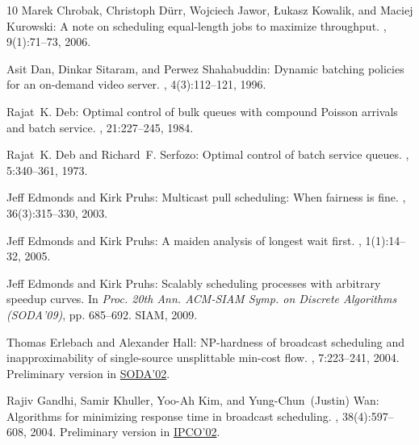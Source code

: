 \begin{thebibliography}{10}
{\sc Marek Chrobak, Christoph D\"{u}rr, Wojciech Jawor, {\L}ukasz Kowalik, and
  Maciej Kurowski}: A note on scheduling equal-length jobs to maximize
  throughput.
, 9(1):71--73, 2006.
\newblock [\epfmtdoi{10.1007/s10951-006-5595-4}]

{\sc Asit Dan, Dinkar Sitaram, and Perwez Shahabuddin}: Dynamic batching
  policies for an on-demand video server.
, 4(3):112--121, 1996.
\newblock [\epfmtdoi{10.1007/s005300050016}]

{\sc Rajat~K. Deb}: Optimal control of bulk queues with compound {P}oisson
  arrivals and batch service.
, 21:227--245, 1984.

{\sc Rajat~K. Deb and Richard~F. Serfozo}: Optimal control of batch service
  queues.
, 5:340--361, 1973.
\newblock [\epfmtdoi{10.2307/1426040}]

{\sc Jeff Edmonds and Kirk Pruhs}: Multicast pull scheduling: When fairness is
  fine.
, 36(3):315--330, 2003.
\newblock [\epfmtdoi{10.1007/s00453-003-1018-5}]

{\sc Jeff Edmonds and Kirk Pruhs}: A maiden analysis of longest wait first.
, 1(1):14--32, 2005.
\newblock [\epfmtdoi{10.1145/1077464.1077467}]

{\sc Jeff Edmonds and Kirk Pruhs}: Scalably scheduling processes with arbitrary
  speedup curves.
\newblock In {\em Proc. 20th Ann. ACM-SIAM Symp. on Discrete Algorithms
  (SODA'09)}, pp. 685--692. SIAM, 2009.
\newblock [\epfmtdoi{10.1145/1496770.1496845}]

{\sc Thomas Erlebach and Alexander Hall}: {NP}-hardness of broadcast scheduling
  and inapproximability of single-source unsplittable min-cost flow.
, 7:223--241, 2004.
\newblock Preliminary version in
  \href{https://dl.acm.org/citation.cfm?id=545381.545405}{SODA'02}.

{\sc Rajiv Gandhi, Samir Khuller, Yoo-Ah Kim, and Yung-Chun~(Justin) Wan}:
  Algorithms for minimizing response time in broadcast scheduling.
, 38(4):597--608, 2004.
\newblock Preliminary version in
  \href{https://dl.acm.org/citation.cfm?id=660079}{IPCO'02}.
\newblock [\epfmtdoi{10.1007/s00453-003-1058-x}]


\end{thebibliography}
